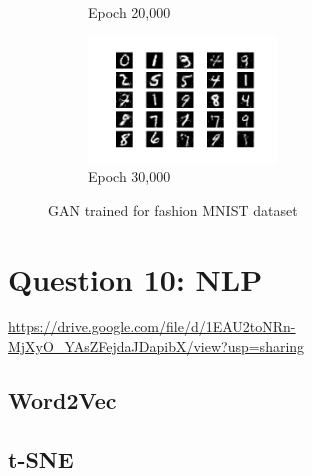 \documentclass[a4paper]{article}    %
\begin{document}
\begin{figure}[H]
\begin{subfigure}{0.48\textwidth}
        \caption{Epoch 20,000}
        \label{fig:fashion_mnist-epoch20000}
    \end{subfigure}
    \hfill
    \begin{subfigure}{0.48\textwidth}
        \centering
        \includegraphics[width=5cm]{29000}
        \caption{Epoch 30,000}
        \label{fig:fashion_mnist-epoch30000}
    \end{subfigure}
    \caption{GAN trained for fashion MNIST dataset} 
    \label{fig:gan-fashion_mnist}
\end{figure}

\newpage
\section{Question 10: NLP}

\href{https://drive.google.com/file/d/1EAU2toNRn-MjXyO_YAsZFejdaJDapibX/view?usp=sharing}{https://drive.google.com/file/d/1EAU2toNRn-MjXyO\_YAsZFejdaJDapibX/view?usp=sharing}

\subsection{Word2Vec}

\subsection{t-SNE}

\graphicspath{{../figures/Q10/}}
\end{document}

